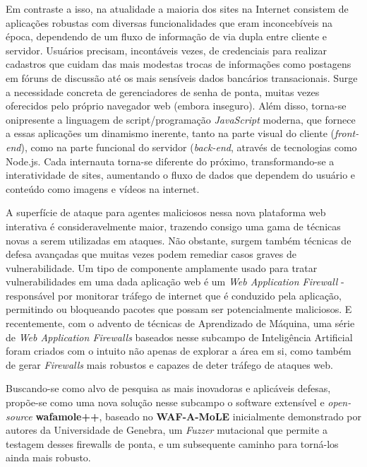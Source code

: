 Em contraste a isso, na atualidade a maioria dos sites na Internet consistem de aplicações robustas com diversas funcionalidades que eram inconcebíveis na época, dependendo de um fluxo de informação de via dupla entre cliente e servidor. Usuários precisam, incontáveis vezes, de credenciais para realizar cadastros que cuidam das mais modestas trocas de informações como postagens em fóruns de discussão até os mais sensíveis dados bancários transacionais. Surge a necessidade concreta de gerenciadores de senha de ponta, muitas vezes oferecidos pelo próprio navegador web (embora inseguro). Além disso, torna-se onipresente a linguagem de script/programação \textit{JavaScript} moderna, que fornece a essas aplicações um dinamismo inerente, tanto na parte visual do cliente (\textit{front-end}), como na parte funcional do servidor (\textit{back-end}, através de tecnologias como Node.js. Cada internauta torna-se diferente do próximo, transformando-se a interatividade de sites, aumentando o fluxo de dados que dependem do usuário e conteúdo como imagens e vídeos na internet.

A superfície de ataque para agentes maliciosos nessa nova plataforma web interativa é consideravelmente maior, trazendo consigo uma gama de técnicas novas a serem utilizadas em ataques. Não obstante, surgem também técnicas de defesa avançadas que muitas vezes podem remediar casos graves de vulnerabilidade. Um tipo de componente amplamente usado para tratar vulnerabilidades em uma dada aplicação web é um \textit{Web Application Firewall} - responsável por monitorar tráfego de internet que é conduzido pela aplicação, permitindo ou bloqueando pacotes que possam ser potencialmente maliciosos. E recentemente, com o advento de técnicas de Aprendizado de Máquina, uma série de \textit{Web Application Firewalls} baseados nesse subcampo de Inteligência Artificial foram criados com o intuito não apenas de explorar a área em si, como também de gerar \textit{Firewalls} mais robustos e capazes de deter tráfego de ataques web. 

Buscando-se como alvo de pesquisa as mais inovadoras e aplicáveis defesas, propõe-se como uma nova solução nesse subcampo o software extensível e \textit{open-source}  \textbf{wafamole++}, baseado no \textbf{WAF-A-MoLE} \cite{valenza_waf--mole_2020} inicialmente demonstrado por autores da Universidade de Genebra, um \textit{Fuzzer} mutacional que permite a testagem desses firewalls de ponta, e um subsequente caminho para torná-los ainda mais robusto. 

